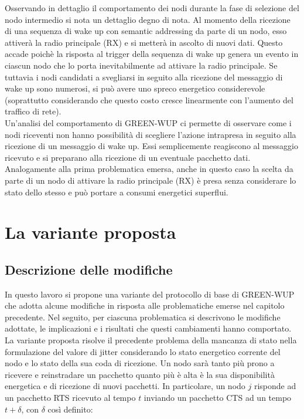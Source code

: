 \documentclass[binding=0.6cm,TFA]{sapthesis}
\begin{document}
Osservando in dettaglio il comportamento dei nodi durante la fase di selezione del nodo intermedio si nota un dettaglio degno di nota.
Al momento della ricezione di una sequenza di wake up con semantic addressing da parte di un nodo, esso attiverà la radio principale (RX) e si metterà
in ascolto di nuovi dati. Questo accade poichè la risposta al trigger della sequenza di wake up genera un evento in ciascun nodo che lo porta
inevitabilmente ad attivare la radio principale. Se tuttavia i nodi candidati a svegliarsi in seguito alla ricezione del messaggio di wake up sono
numerosi, si può avere uno spreco energetico considerevole (soprattutto considerando che questo costo cresce linearmente con l'aumento del traffico
di rete).\\

Un'analisi del comportamento di GREEN-WUP ci permette di osservare come i nodi riceventi non hanno possibilità di scegliere l'azione
intrapresa in seguito alla ricezione di un messaggio di wake up. Essi semplicemente reagiscono al messaggio ricevuto e si preparano alla ricezione
di un eventuale pacchetto dati. Analogamente alla prima problematica emersa, anche in questo caso la scelta da parte di un nodo di attivare la
radio principale (RX) è presa senza considerare lo stato dello stesso e può portare a consumi energetici superflui.

\chapter{La variante proposta}

\section{Descrizione delle modifiche}

In questo lavoro si propone una variante del protocollo di base di GREEN-WUP che adotta alcune modifiche in risposta alle problematiche emerse nel capitolo
precedente. Nel seguito, per ciascuna problematica si descrivono le modifiche adottate, le implicazioni e i risultati che questi cambiamenti hanno comportato.\\

La variante proposta risolve il precedente problema della mancanza di stato nella formulazione del valore di jitter considerando lo stato energetico
corrente del nodo e lo stato della sua coda di ricezione. Un nodo sarà tanto più prono a ricevere e reinstradare un pacchetto quanto
più è alta è la sua disponibilità energetica e di ricezione di nuovi pacchetti. In particolare, un nodo $j$ risponde ad un pacchetto RTS ricevuto al
tempo $t$ inviando un pacchetto CTS ad un tempo $t+\delta$, con $\delta$ così definito:
\end{document}
